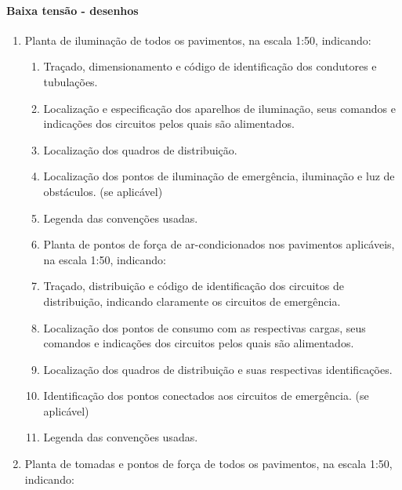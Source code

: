 \paragraph{Baixa tensão - desenhos}
	\begin{enumerate}

		\item Planta de iluminação de todos os pavimentos, na escala 1:50, indicando:
			\begin{enumerate}
				\item Traçado, dimensionamento e código de identificação dos condutores e tubulações.

				\item Localização e especificação dos aparelhos de iluminação, seus comandos e indicações dos circuitos pelos quais são alimentados.

				\item Localização dos quadros de distribuição.

				\item Localização dos pontos de iluminação de emergência, iluminação e luz de obstáculos. (se aplicável)

				\item Legenda das convenções usadas.

				\item Planta de pontos de força de ar-condicionados nos pavimentos aplicáveis, na escala 1:50, indicando:

				\item Traçado, distribuição e código de identificação dos circuitos de distribuição, indicando claramente os circuitos de emergência.

				\item Localização dos pontos de consumo com as respectivas cargas, seus comandos e indicações dos circuitos pelos quais são alimentados.

				\item Localização dos quadros de distribuição e suas respectivas identificações.

				\item Identificação dos pontos conectados aos circuitos de emergência. (se aplicável)

				\item Legenda das convenções usadas.
			\end{enumerate}
		
		\item Planta de tomadas e pontos de força de todos os pavimentos, na escala 1:50, indicando:
		\begin{enumerate}


\end{enumerate}
\end{enumerate}
